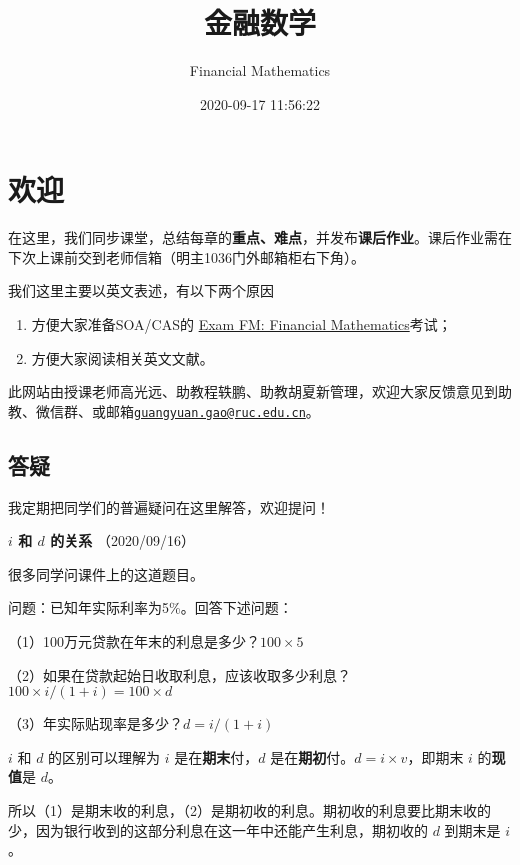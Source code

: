\documentclass[
]{book}
\title{金融数学}
\author{Financial Mathematics}
\date{2020-09-17 11:56:22}
\begin{document}
\maketitle

{
\setcounter{tocdepth}{1}
\tableofcontents
}
\hypertarget{ux6b22ux8fce}{%
\chapter*{欢迎}\label{ux6b22ux8fce}}

在这里，我们同步课堂，总结每章的\textbf{重点、难点}，并发布\textbf{课后作业}。课后作业需在下次上课前交到老师信箱（明主1036门外邮箱柜右下角）。

我们这里主要以英文表述，有以下两个原因

\begin{enumerate}
\def\labelenumi{\arabic{enumi}.}
\item
  方便大家准备SOA/CAS的 \href{https://www.soa.org/education/exam-req/edu-exam-fm-detail/}{Exam FM: Financial Mathematics}考试；
\item
  方便大家阅读相关英文文献。
\end{enumerate}

此网站由授课老师高光远、助教程轶鹏、助教胡夏新管理，欢迎大家反馈意见到助教、微信群、或邮箱\href{mailto:guangyuan.gao@ruc.edu.cn}{\nolinkurl{guangyuan.gao@ruc.edu.cn}}。

\hypertarget{ux7b54ux7591}{%
\section*{答疑}\label{ux7b54ux7591}}

我定期把同学们的普遍疑问在这里解答，欢迎提问！

\textbf{\(i\) 和 \(d\) 的关系} （2020/09/16）

很多同学问课件上的这道题目。

问题：已知年实际利率为5\%。回答下述问题：

（1）100万元贷款在年末的利息是多少？\(100\times5%
\)

（2）如果在贷款起始日收取利息，应该收取多少利息？\(100\times i/(1+i)=100\times d\)

（3）年实际贴现率是多少？\(d=i/(1+i)\)

\(i\) 和 \(d\) 的区别可以理解为 \(i\) 是在\textbf{期末}付，\(d\) 是在\textbf{期初}付。\(d=i\times v\)，即期末 \(i\) 的\textbf{现值}是 \(d\)。

所以（1）是期末收的利息，（2）是期初收的利息。期初收的利息要比期末收的少，因为银行收到的这部分利息在这一年中还能产生利息，期初收的 \(d\) 到期末是 \(i\)。
\end{document}
